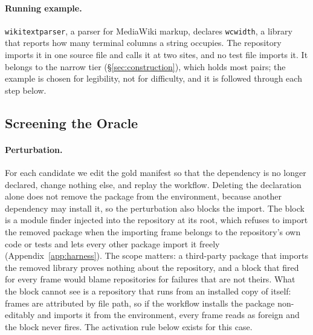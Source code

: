 \documentclass[11pt]{article}
\newcommand{\code}[1]{\texttt{\small #1}}
\begin{document}
\paragraph{Running example.}
\code{wikitextparser}, a parser for MediaWiki markup, declares \code{wcwidth}, a library that reports how many terminal columns a string occupies.
The repository imports it in one source file and calls it at two sites, and no test file imports it.
It belongs to the narrow tier (\S\ref{sec:construction}), which holds most pairs; the example is chosen for legibility, not for difficulty, and it is followed through each step below.

\subsection{Screening the Oracle}
\label{sec:screening}

\paragraph{Perturbation.}
For each candidate we edit the gold manifest so that the dependency is no longer declared, change nothing else, and replay the workflow.
Deleting the declaration alone does not remove the package from the environment, because another dependency may install it, so the perturbation also blocks the import.
The block is a module finder injected into the repository at its root, which refuses to import the removed package when the importing frame belongs to the repository's own code or tests and lets every other package import it freely (Appendix~\ref{app:harness}).
The scope matters: a third-party package that imports the removed library proves nothing about the repository, and a block that fired for every frame would blame repositories for failures that are not theirs.
What the block cannot see is a repository that runs from an installed copy of itself: frames are attributed by file path, so if the workflow installs the package non-editably and imports it from the environment, every frame reads as foreign and the block never fires.
The activation rule below exists for this case.
\end{document}
